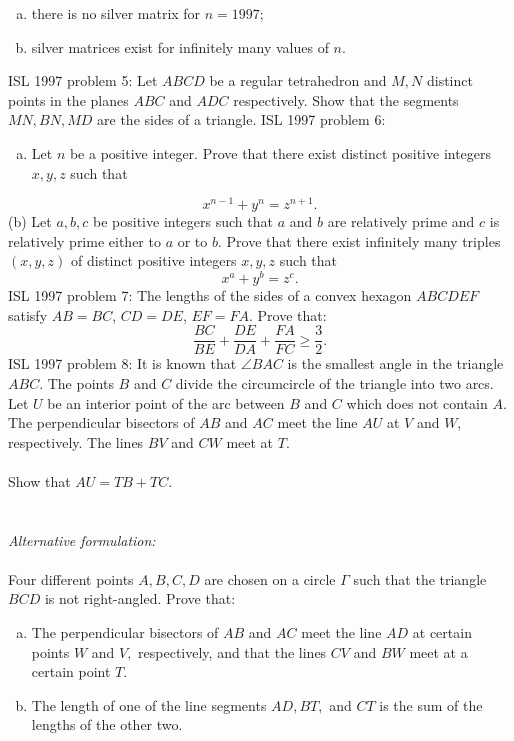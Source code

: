 \begin{enumerate}[(a)]
  \item there is no silver matrix for $ n = 1997$;
  \item silver matrices exist for infinitely many values of $ n$.
\end{enumerate} 
ISL 1997 problem 5:  Let $ ABCD$ be a regular tetrahedron and $ M,N$ distinct points in the planes $ ABC$ and $ ADC$ respectively. Show that the segments $ MN,BN,MD$ are the sides of a triangle. 
ISL 1997 problem 6:  \begin{enumerate}[(a)]
  \item Let $ n$ be a positive integer. Prove that there exist distinct positive integers $ x, y, z$ such that
\end{enumerate}
\[ x^{n-1} + y^n = z^{n+1}. \]
(b) Let $ a, b, c$ be positive integers such that $ a$ and $ b$ are relatively prime and $ c$ is relatively prime either to $ a$ or to $ b.$ Prove that there exist infinitely many triples $ (x, y, z)$ of distinct positive integers $ x, y, z$ such that
\[ x^a + y^b = z^c. \] 
ISL 1997 problem 7:  The lengths of the sides of a convex hexagon $ ABCDEF$ satisfy $ AB = BC$, $ CD = DE$, $ EF = FA$. Prove that:
\[ \frac {BC}{BE} + \frac {DE}{DA} + \frac {FA}{FC} \geq \frac {3}{2}. \] 
ISL 1997 problem 8:  It is known that $ \angle BAC$ is the smallest angle in the triangle $ ABC$. The points $ B$ and $ C$ divide the circumcircle of the triangle into two arcs. Let $ U$ be an interior point of the arc between $ B$ and $ C$ which does not contain $ A$. The perpendicular bisectors of $ AB$ and $ AC$ meet the line $ AU$ at $ V$ and $ W$, respectively. The lines $ BV$ and $ CW$ meet at $ T$. \\\\
Show that $ AU = TB + TC$. \\\\\\
\textit{Alternative formulation:} \\\\
Four different points $ A,B,C,D$ are chosen on a circle $ \Gamma$ such that the triangle $ BCD$ is not right-angled. Prove that:
\begin{enumerate}[(a)]
  \item The perpendicular bisectors of $ AB$ and $ AC$ meet the line $ AD$ at certain points $ W$ and $ V,$ respectively, and that the lines $ CV$ and $ BW$ meet at a certain point $ T.$
  \item The length of one of the line segments $ AD, BT,$ and $ CT$ is the sum of the lengths of the other two.
\end{enumerate} 
